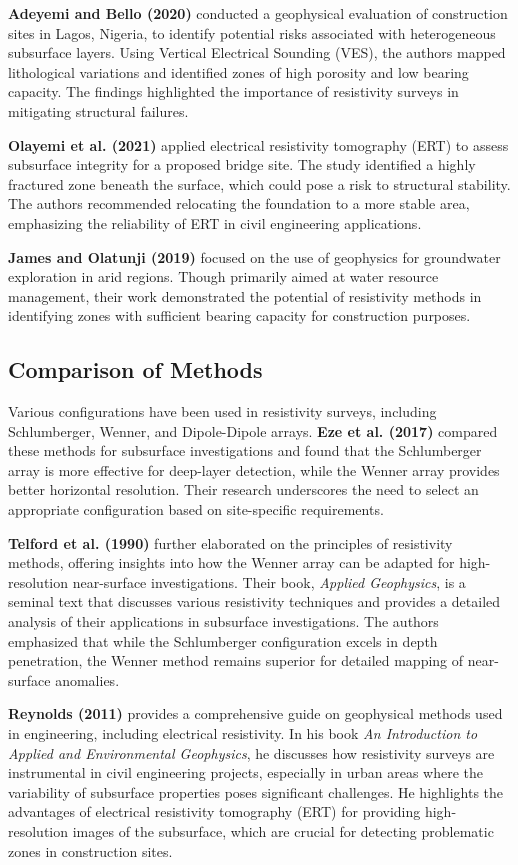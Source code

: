 \documentclass[12pt,a4paper]{report}
\begin{document}
\textbf{Adeyemi and Bello (2020)} conducted a geophysical evaluation of construction sites in Lagos, Nigeria, to identify potential risks associated with heterogeneous subsurface layers. Using Vertical Electrical Sounding (VES), the authors mapped lithological variations and identified zones of high porosity and low bearing capacity. The findings highlighted the importance of resistivity surveys in mitigating structural failures.

\textbf{Olayemi et al. (2021)} applied electrical resistivity tomography (ERT) to assess subsurface integrity for a proposed bridge site. The study identified a highly fractured zone beneath the surface, which could pose a risk to structural stability. The authors recommended relocating the foundation to a more stable area, emphasizing the reliability of ERT in civil engineering applications.

\textbf{James and Olatunji (2019)} focused on the use of geophysics for groundwater exploration in arid regions. Though primarily aimed at water resource management, their work demonstrated the potential of resistivity methods in identifying zones with sufficient bearing capacity for construction purposes.

\subsection{Comparison of Methods}
Various configurations have been used in resistivity surveys, including Schlumberger, Wenner, and Dipole-Dipole arrays. \textbf{Eze et al. (2017)} compared these methods for subsurface investigations and found that the Schlumberger array is more effective for deep-layer detection, while the Wenner array provides better horizontal resolution. Their research underscores the need to select an appropriate configuration based on site-specific requirements.

\textbf{Telford et al. (1990)} further elaborated on the principles of resistivity methods, offering insights into how the Wenner array can be adapted for high-resolution near-surface investigations. Their book, \textit{Applied Geophysics}, is a seminal text that discusses various resistivity techniques and provides a detailed analysis of their applications in subsurface investigations. The authors emphasized that while the Schlumberger configuration excels in depth penetration, the Wenner method remains superior for detailed mapping of near-surface anomalies.

\textbf{Reynolds (2011)} provides a comprehensive guide on geophysical methods used in engineering, including electrical resistivity. In his book \textit{An Introduction to Applied and Environmental Geophysics}, he discusses how resistivity surveys are instrumental in civil engineering projects, especially in urban areas where the variability of subsurface properties poses significant challenges. He highlights the advantages of electrical resistivity tomography (ERT) for providing high-resolution images of the subsurface, which are crucial for detecting problematic zones in construction sites.
\end{document}
